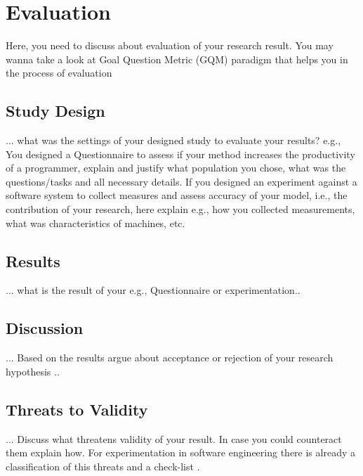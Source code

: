 
\section{Evaluation}
\label{chap:evaluation}

Here, you need to discuss about evaluation of your research result. You may wanna take a look at Goal Question Metric (GQM) paradigm that helps you in the process of evaluation \cite{caldiera1994goal}

\subsection{Study Design}
... what was the settings of your designed study to evaluate your results? e.g., You designed a Questionnaire to assess if your method increases the productivity of a programmer, explain and justify what population you chose, what was the questions/tasks and all necessary details. If you designed an experiment against a software system to collect measures and assess accuracy of your model, i.e., the contribution of your research, here explain e.g., how you collected measurements, what was characteristics of machines, etc.

\subsection{Results}
... what is the result of your e.g., Questionnaire or experimentation.. 

\subsection{Discussion}
... Based on the results argue about acceptance or rejection of your research hypothesis   .. 

\subsection{Threats to Validity}
... Discuss what threatens validity of your result. In case you could counteract them explain how. For experimentation in software engineering there is already a classification of this threats and a check-list \cite{DBLP:journals/ese/RunesonH09}.   


